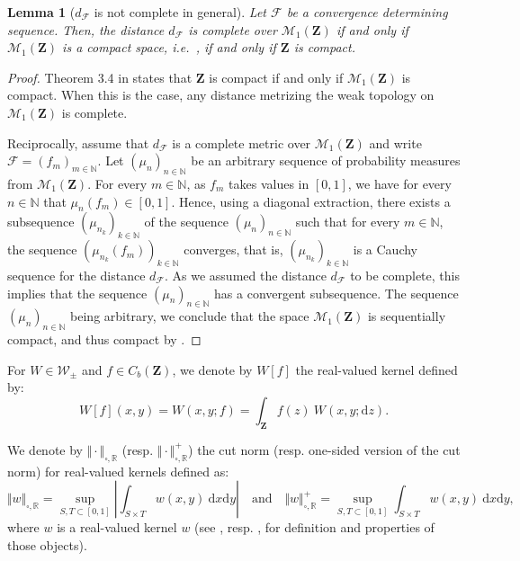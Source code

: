 \documentclass{amsart}
\newcommand{\ie}{i.e.\ }
\theoremstyle{plain}
\newtheorem{lemme}[Th]{Lemma}
\theoremstyle{definition}
\newcommand{\Space}{\mathbf{Z}}
\newcommand{\signed}{\pm}
\newcommand{\Proba}{\mathcal{M}_1(\Space)}
\newcommand{\CbFunct}{C_b(\Space)}
\newcommand{\Kernel}{\mathcal{W}_{\signed}}
\newcommand{\NcutR}[1]{\Vert#1\Vert_{\square,\R}}
\newcommand{\NcutRSymbol}{\Vert\cdot\Vert_{\square,\R}}
\newcommand{\NcutRpos}[1]{\Vert#1\Vert_{\square,\R}^+}
\newcommand{\dmeasF}{d_{\mathcal{F}}}
\newcommand{\F}{\mathcal{F}}
\newcommand{\N}{\mathbb{N}}
\newcommand{\R}{\mathbb{R}}
\newcommand{\drv}{\mathrm{d}}
\begin{document}
\begin{lemme}[$\dmeasF$ is not complete in general]\label{d_F_complete}
Let $\F$ be a convergence determining sequence.
Then, the distance $\dmeasF$ is  complete over $\Proba$
if and only if $\Proba$ is a compact space,
\emph{\ie}, if and only if $\Space$ is  compact.
\end{lemme}

\begin{proof}
Theorem 3.4 in \cite{Varadarajan} states that
$\Space$ is compact if and only if $\Proba$ is compact.
When this is the case, any distance metrizing the weak topology
on $\Proba$ is complete.

Reciprocally, assume that $\dmeasF$ is a complete metric over $\Proba$
	and write $\F=(f_m)_{m\in\N}$.
Let $(\mu_n)_{n\in\N}$ be an arbitrary sequence of probability measures
from $\Proba$.
For every $m\in\N$, as $f_m$ takes values in $[0,1]$,
we have for every $n\in\N$ that $\mu_n(f_m) \in [0,1]$.
Hence, using a diagonal extraction, there exists a subsequence $(\mu_{n_k} )_{k\in\N}$ of
the sequence $(\mu_n)_{n\in\N}$ such that for every $m\in\N$,
the sequence $(\mu_{n_k}(f_m) )_{k\in\N}$ converges, 
that is,  $(\mu_{n_k} )_{k\in\N}$ is a Cauchy sequence
for the distance $\dmeasF$. 
As we assumed the distance $\dmeasF$ to be complete,
this implies that the sequence $(\mu_n)_{n\in\N}$
has a convergent subsequence.
The sequence $(\mu_n)_{n\in\N}$ being arbitrary,
we conclude that the space $\Proba$ is sequentially compact, and thus compact by .
\end{proof}

\medskip


For  $W\in\Kernel$ and  $f\in\CbFunct$, 
we denote by $W[f]$ the real-valued kernel defined by:
\begin{equation}
   \label{eq:notation_graphon_function}
  W[f](x,y) = W(x,y;f) = \int_{\Space} f(z)\ W(x,y;\drv z).
\end{equation}

We denote by $\NcutRSymbol$ (resp. $\NcutRpos{\cdot}$)
	the cut norm (resp. one-sided version of the cut norm) for real-valued kernels
	defined as:
\begin{equation}
	\label{eq_def_NcutR}
\NcutR{w} = \sup_{S,T \subset [0,1]} \left\vert \int_{S\times T} w(x,y)\ \drv x\drv y \right\vert
\quad \text{and} \quad
\NcutRpos{w} = \sup_{S,T \subset [0,1]} \int_{S\times T} w(x,y)\ \drv x\drv y ,
\end{equation}
where $w$ is a real-valued kernel $w$
(see \cite[Section 8.2]{Lovasz}, resp. \cite[Section 10.3]{Lovasz},
	for definition and properties of those objects).
\end{document}
